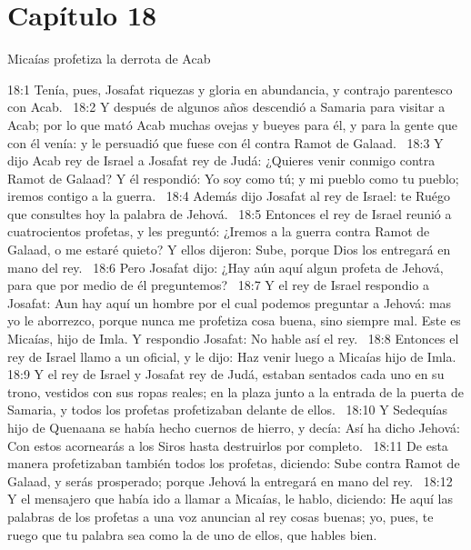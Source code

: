 																	\section*{Capítulo 18}
																		Micaías profetiza la derrota de Acab  
																		
																		
																		18:1 Tenía, pues, Josafat riquezas y gloria en abundancia, y contrajo parentesco con Acab.  
																		18:2 Y después de algunos años descendió a Samaria para visitar a Acab; por lo que mató Acab muchas ovejas y bueyes para él, y para la gente que con él venía: y le persuadió que fuese con él contra Ramot de Galaad.  
																		18:3 Y dijo Acab rey de Israel a Josafat rey de Judá: ¿Quieres venir conmigo contra Ramot de Galaad? Y él respondió: Yo soy como tú; y mi pueblo como tu pueblo; iremos contigo a la guerra.  
																		18:4 Además dijo Josafat al rey de Israel: te Ruégo que consultes hoy la palabra de Jehová.  
																		18:5 Entonces el rey de Israel reunió a cuatrocientos profetas, y les preguntó: ¿Iremos a la guerra contra Ramot de Galaad, o me estaré quieto? Y ellos dijeron: Sube, porque Dios los entregará en mano del rey.  
																		18:6 Pero Josafat dijo: ¿Hay aún aquí algun profeta de Jehová, para que por medio de él preguntemos?  
																		18:7 Y el rey de Israel respondio a Josafat: Aun hay aquí un hombre por el cual podemos preguntar a Jehová: mas yo le aborrezco, porque nunca me profetiza cosa buena, sino siempre mal. Este es Micaías, hijo de Imla. Y respondio Josafat: No hable así el rey.  
																		18:8 Entonces el rey de Israel llamo a un oficial, y le dijo: Haz venir luego a Micaías hijo de Imla.  
																		18:9 Y el rey de Israel y Josafat rey de Judá, estaban sentados cada uno en su trono, vestidos con sus ropas reales; en la plaza junto a la entrada de la puerta de Samaria, y todos los profetas profetizaban delante de ellos.  
																		18:10 Y Sedequías hijo de Quenaana se había hecho cuernos de hierro, y decía: Así ha dicho Jehová: Con estos acornearás a los Siros hasta destruirlos por completo.  
																		18:11 De esta manera profetizaban también todos los profetas, diciendo: Sube contra Ramot de Galaad, y serás prosperado; porque Jehová la entregará en mano del rey.  
																		18:12 Y el mensajero que había ido a llamar a Micaías, le hablo, diciendo: He aquí las palabras de los profetas a una voz anuncian al rey cosas buenas; yo, pues, te ruego que tu palabra sea como la de uno de ellos, que hables bien.  
